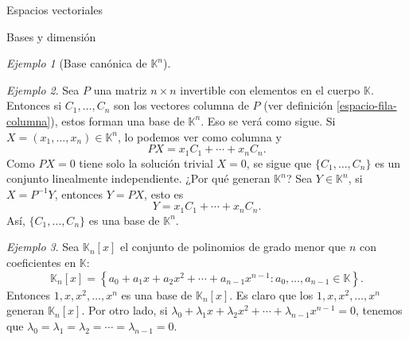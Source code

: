 \documentclass[a4paper,12pt,twoside,spanish,reqno]{amsbook}
\numberwithin{equation}{section}
\theoremstyle{definition}
\theoremstyle{remark}
\newtheorem*{ejemplo*}{Ejemplo}
\newcommand{\K}{\mathbb K}
\begin{document}
\begin{chapter}{Espacios vectoriales}
\begin{section}{Bases y dimensión}
\begin{ejemplo*}[{\sc Base canónica de $\K^n$}]
\begin{enumerate}
        
    \end{enumerate}
\end{ejemplo*}
 
 
 \begin{ejemplo*}
     Sea $P$ una matriz $n \times n$ invertible con elementos en el cuerpo $\K$. Entonces si $C_1,\ldots,C_n$ son los vectores columna de $P$ (ver definición  \ref{espacio-fila-columna}), estos forman una base de $\K^n$. Eso se verá como sigue. Si $X = (x_1,\ldots,x_n) \in \K^n$, lo podemos ver como columna y 
     $$
     PX=x_1C_1+\cdots+x_nC_n.
     $$
     Como $PX=0$ tiene solo la solución trivial $X= 0$, se sigue que $\{C_1,\ldots,C_n\}$ es un conjunto linealmente independiente. ¿Por qué generan $\K^n$? Sea $Y \in \K^n$, si $X = P^{-1} Y$, entonces $Y = PX$, esto es
     $$
     Y=x_1C_1+\cdots+x_nC_n.
     $$
     Así, $\{C_1,\ldots,C_n\}$ es una base de $\K^n$.
 \end{ejemplo*}


\begin{ejemplo*}
    Sea $\K_n[x]$  el conjunto de polinomios de grado menor  que $n$ con coeficientes en $\K$:
    $$
    \K_n[x] = \left\{a_0 + a_1 x + a_2x^2+\cdots+a_{n-1}x^{n-1}: a_0,\ldots,a_{n-1} \in \K  \right\}.
    $$
    Entonces $1,x,x^2,\ldots,x^n$  es una base de $\K_n[x]$. Es claro que los $1,x,x^2,\ldots,x^n$ generan $\K_n[x]$. Por otro lado, si  $\lambda_0 + \lambda_1 x + \lambda_2x^2+\cdots+\lambda_{n-1}x^{n-1} =0$, tenemos que $\lambda_0=\lambda_1 = \lambda_2 =\cdots =\lambda_{n-1} =0$.
\end{ejemplo*}


\end{section}
\end{chapter}
\end{document}
